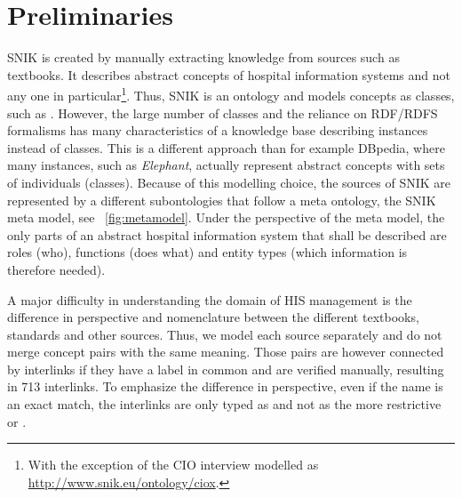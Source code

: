 \documentclass[conference]{IEEEtran}
\begin{document}


\section{Preliminaries}
SNIK is created by manually extracting knowledge from sources such as textbooks.
It describes abstract concepts of hospital information systems and not any one in particular\footnote{With the exception of the CIO interview modelled as \url{http://www.snik.eu/ontology/ciox}.}.
Thus, SNIK is an ontology and models concepts as classes, such as .
However, the large number of classes and the reliance on RDF/RDFS formalisms has many characteristics of a knowledge base describing instances instead of classes.
This is a different approach than for example DBpedia, where many instances, such as \emph{Elephant}, actually represent abstract concepts with sets of individuals (classes).
Because of this modelling choice, the sources of SNIK are represented by a different subontologies that follow a meta ontology, the SNIK meta model, see ~\cref{fig:metamodel}.
Under the perspective of the meta model, the only parts of an abstract hospital information system that shall be described are roles (who), functions (does what) and entity types (which information is therefore needed).

A major difficulty in understanding the domain of HIS management is the difference in perspective and nomenclature between the different textbooks, standards and other sources.
Thus, we model each source separately and do not merge concept pairs with the same meaning.
Those pairs are however connected by interlinks if they have a label in common and are verified manually, resulting in 713 interlinks. 
To emphasize the difference in perspective, even if the name is an exact match, the interlinks are only typed as  and not as the more restrictive  or .
\end{document}
